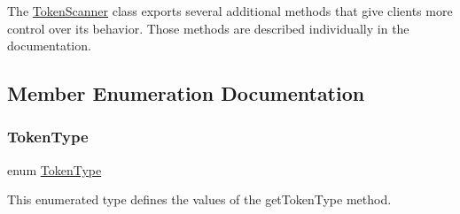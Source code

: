 The {\ttfamily \mbox{\hyperlink{classTokenScanner}{Token\+Scanner}}} class exports several additional methods that give clients more control over its behavior. Those methods are described individually in the documentation. 

\subsection{Member Enumeration Documentation}
\mbox{\label{classTokenScanner_aa520fbf142ba1e7e659590c07da31921}} 
\subsubsection{\texorpdfstring{Token\+Type}{TokenType}}
{\footnotesize\ttfamily enum \mbox{\hyperlink{classTokenScanner_aa520fbf142ba1e7e659590c07da31921}{Token\+Type}}}



This enumerated type defines the values of the {\ttfamily get\+Token\+Type} method. 

